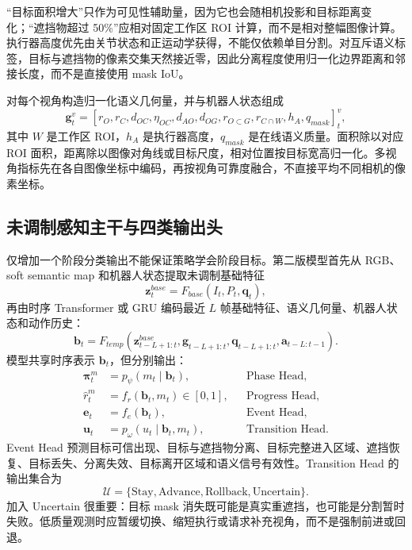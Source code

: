 \documentclass[UTF8,a4paper,11pt]{ctexart}
\begin{document}
“目标面积增大”只作为可见性辅助量，因为它也会随相机投影和目标距离变化；“遮挡物超过 50\%”应相对固定工作区 ROI 计算，而不是相对整幅图像计算。执行器高度优先由关节状态和正运动学获得，不能仅依赖单目分割。对互斥语义标签，目标与遮挡物的像素交集天然接近零，因此分离程度使用归一化边界距离和邻接长度，而不是直接使用 mask IoU。

对每个视角构造归一化语义几何量，并与机器人状态组成
\begin{equation}
\bm g_t^v=[r_O,r_C,d_{OC},\eta_{OC},d_{AO},d_{OG},
r_{O\subset G},r_{C\cap W},h_A,q_{mask}]_t^v,
\end{equation}
其中 $W$ 是工作区 ROI，$h_A$ 是执行器高度，$q_{mask}$ 是在线语义质量。面积除以对应 ROI 面积，距离除以图像对角线或目标尺度，相对位置按目标宽高归一化。多视角指标先在各自图像坐标中编码，再按视角可靠度融合，不直接平均不同相机的像素坐标。

\subsection{未调制感知主干与四类输出头}

仅增加一个阶段分类输出不能保证策略学会阶段目标。第二版模型首先从 RGB、soft semantic map 和机器人状态提取未调制基础特征
\begin{equation}
\bm z_t^{base}=F_{base}(I_t,P_t,\bm q_t),
\end{equation}
再由时序 Transformer 或 GRU 编码最近 $L$ 帧基础特征、语义几何量、机器人状态和动作历史：
\begin{equation}
\bm b_t=F_{temp}(\bm z_{t-L+1:t}^{base},\bm g_{t-L+1:t},
\bm q_{t-L+1:t},\bm a_{t-L:t-1}).
\end{equation}
模型共享时序表示 $\bm b_t$，但分别输出：
\begin{align}
\bm\pi_t^m &= p_\psi(m_t\mid\bm b_t), &&\text{Phase Head},\\
\hat r_t^m &= f_r(\bm b_t,m_t)\in[0,1], &&\text{Progress Head},\\
\bm e_t &= f_e(\bm b_t), &&\text{Event Head},\\
\bm u_t &= p_\omega(u_t\mid\bm b_t,m_t), &&\text{Transition Head}.
\end{align}
Event Head 预测目标可信出现、目标与遮挡物分离、目标完整进入区域、遮挡恢复、目标丢失、分离失效、目标离开区域和语义信号有效性。Transition Head 的输出集合为
\begin{equation}
\mathcal U=\{\text{Stay},\text{Advance},\text{Rollback},\text{Uncertain}\}.
\end{equation}
加入 Uncertain 很重要：目标 mask 消失既可能是真实重遮挡，也可能是分割暂时失败。低质量观测时应暂缓切换、缩短执行或请求补充视角，而不是强制前进或回退。
\end{document}
